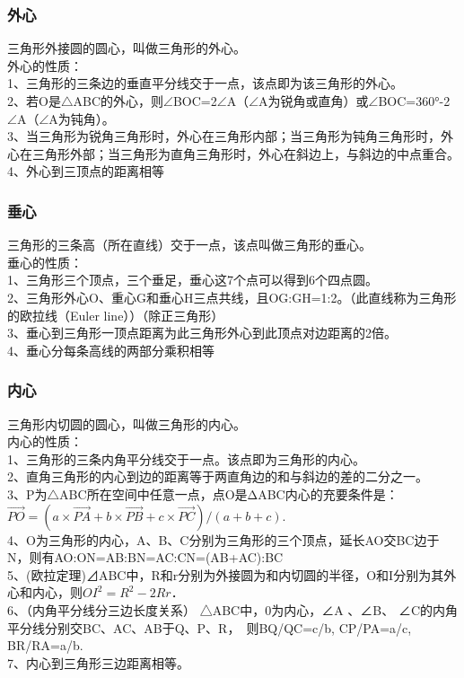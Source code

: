 \documentclass[UTF8]{ctexart}
\begin{document}
			\subsubsection{外心}
				三角形外接圆的圆心，叫做三角形的外心。\\
				外心的性质：\\
				1、三角形的三条边的垂直平分线交于一点，该点即为该三角形的外心。\\
				2、若O是$\bigtriangleup$ABC的外心，则$\angle$BOC=2$\angle$A（$\angle$A为锐角或直角）或$\angle$BOC=360°-2$\angle$A（$\angle$A为钝角）。\\
				3、当三角形为锐角三角形时，外心在三角形内部；当三角形为钝角三角形时，外心在三角形外部；当三角形为直角三角形时，外心在斜边上，与斜边的中点重合。\\
				4、外心到三顶点的距离相等
			\subsubsection{垂心}
				三角形的三条高（所在直线）交于一点，该点叫做三角形的垂心。\\
				垂心的性质：\\
				1、三角形三个顶点，三个垂足，垂心这7个点可以得到6个四点圆。\\
				2、三角形外心O、重心G和垂心H三点共线，且OG:GH=1:2。（此直线称为三角形的欧拉线（Euler line））（除正三角形）\\
				3、垂心到三角形一顶点距离为此三角形外心到此顶点对边距离的2倍。\\
				4、垂心分每条高线的两部分乘积相等
			\subsubsection{内心}
				三角形内切圆的圆心，叫做三角形的内心。\\
				内心的性质：\\
				1、三角形的三条内角平分线交于一点。该点即为三角形的内心。\\
				2、直角三角形的内心到边的距离等于两直角边的和与斜边的差的二分之一。\\
				3、P为$\bigtriangleup$ABC所在空间中任意一点，点O是ΔABC内心的充要条件是：$\overrightarrow{PO}=(a×\overrightarrow{PA} +b×\overrightarrow{PB} +c×\overrightarrow{PC} )/(a+b+c)$.\\
				4、O为三角形的内心，A、B、C分别为三角形的三个顶点，延长AO交BC边于N，则有AO:ON=AB:BN=AC:CN=(AB+AC):BC\\
				5、(欧拉定理)⊿ABC中，R和r分别为外接圆为和内切圆的半径，O和I分别为其外心和内心，则$OI^2=R^2-2Rr$．\\
				6、（内角平分线分三边长度关系）
				△ABC中，0为内心，∠A 、∠B、 ∠C的内角平分线分别交BC、AC、AB于Q、P、R，　则BQ/QC=c/b, CP/PA=a/c, BR/RA=a/b.\\
				7、内心到三角形三边距离相等。
\end{document}
